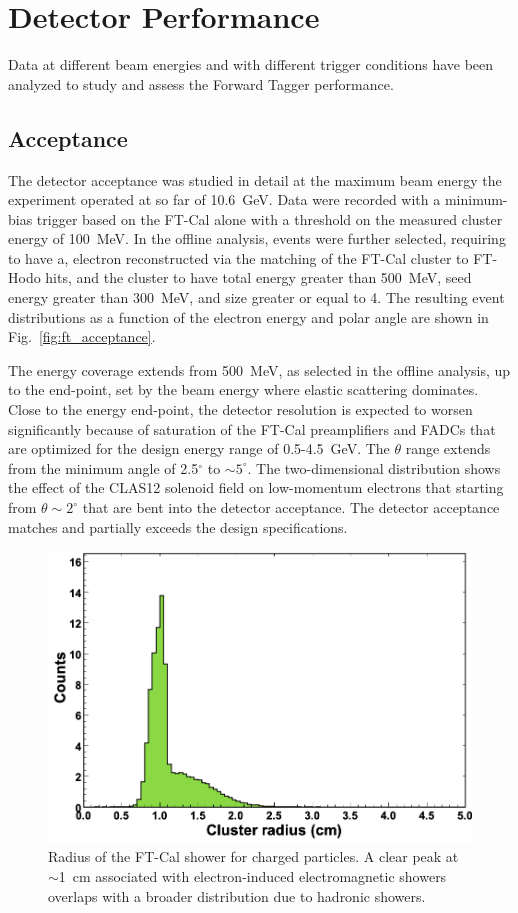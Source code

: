 \section{Detector Performance}

Data at different beam energies and with different trigger conditions have been analyzed to study and assess the
Forward Tagger performance. 

\subsection{Acceptance}

The detector acceptance was studied in detail at the maximum beam energy the experiment operated at so far of
10.6~GeV. Data were recorded with a minimum-bias trigger based on the FT-Cal alone with a threshold on the
measured cluster energy of 100~MeV. In the offline analysis, events were further selected, requiring to have a,
electron reconstructed via the matching of the FT-Cal cluster to FT-Hodo hits, and the cluster to have total energy
greater than 500~MeV, seed energy greater than 300~MeV, and size greater or equal to 4. The resulting event
distributions as a function of the electron energy and polar angle are shown in Fig.~\ref{fig:ft_acceptance}. 

The energy coverage extends from 500~MeV, as selected in the offline analysis, up to the end-point, set by the
beam energy where elastic scattering dominates. Close to the energy end-point, the detector resolution is expected
to worsen significantly because of saturation of the FT-Cal preamplifiers and FADCs that are optimized for the
design energy range of 0.5-4.5~GeV. The $\theta$ range extends from the minimum angle of 2.5$^\circ$ to
$\sim5^\circ$. The two-dimensional distribution shows the effect of the CLAS12 solenoid field on low-momentum
electrons that starting from $\theta\sim2^\circ$ that are bent into the detector acceptance. The detector
acceptance matches and partially exceeds the design specifications. 

\begin{figure}[h]
\includegraphics[height=0.65\columnwidth]{fig/ft_shower.png}
\caption{Radius of the FT-Cal shower for charged particles. A clear peak at $\sim$1~cm associated with
  electron-induced electromagnetic showers overlaps with a broader distribution due to hadronic showers.}
\label{fig:ft_shower}
\end{figure}

